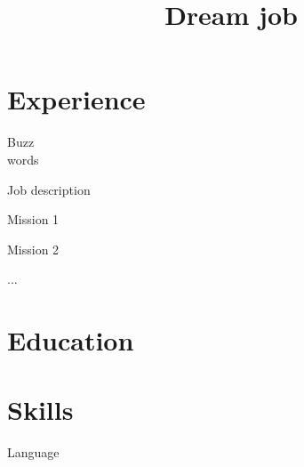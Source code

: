 \documentclass[a4paper,11pt]{cvamm}%
\title{Dream job}
\begin{document}
\section{Experience}
{Buzz\\words}
	{ Job description
	\begin{cvmissions}
		\item Mission 1
		\item Mission 2
		\item ...
	\end{cvmissions}
}
\section{Education}
\section{Skills}
\begin{cvskills} {Language}
\end{cvskills}
\end{document}
